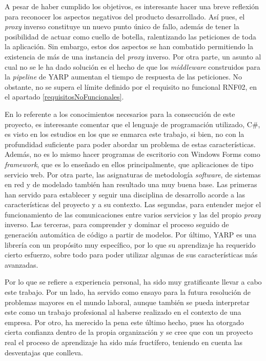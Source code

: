 \documentclass[11pt,spanish,listoffigures]{tfgetsinf}
\begin{document}
A pesar de haber cumplido los objetivos, es interesante hacer una breve reflexión para reconocer los aspectos negativos del producto desarrollado. Así pues, el \emph{proxy} inverso constituye un nuevo punto único de fallo, además de tener la posibilidad de actuar como cuello de botella, ralentizando las peticiones de toda la aplicación. Sin embargo, estos dos aspectos se han combatido permitiendo la existencia de más de una instancia del \emph{proxy} inverso. Por otra parte, un asunto al cual no se le ha dado solución es el hecho de que los \emph{middleware} construidos para la \emph{pipeline} de YARP aumentan el tiempo de respuesta de las peticiones. No obstante, no se supera el límite definido por el requisito no funcional RNF02, en el apartado \ref{requisitosNoFuncionales}.

En lo referente a los conocimientos necesarios para la consecución de este proyecto, es interesante comentar que el lenguaje de programación utilizado, C\#, es visto en los estudios en los que se enmarca este trabajo, si bien, no con la profundidad suficiente para poder abordar un problema de estas características. Además, no es lo mismo hacer programas de escritorio con Windows Forms \cite{WinForms} como \emph{framework}, que es lo enseñado en ellos principalmente, que aplicaciones de tipo servicio web. Por otra parte, las asignaturas de metodología \emph{software}, de sistemas en red y de modelado también han resultado una muy buena base. Las primeras han servido para establecer y seguir una disciplina de desarrollo acorde a las características del proyecto y a su contexto. Las segundas, para entender mejor el funcionamiento de las comunicaciones entre varios servicios y las del propio \emph{proxy} inverso. Las terceras, para comprender y dominar el proceso seguido de generación automática de código a partir de modelos. Por último, YARP es una librería con un propósito muy específico, por lo que su aprendizaje ha requerido cierto esfuerzo, sobre todo para poder utilizar algunas de sus características más avanzadas.

Por lo que se refiere a experiencia personal, ha sido muy gratificante llevar a cabo este trabajo. Por un lado, ha servido como ensayo para la futura resolución de problemas mayores en el mundo laboral, aunque también se pueda interpretar este como un trabajo profesional al haberse realizado en el contexto de una empresa. Por otro, ha merecido la pena este último hecho, pues ha otorgado cierta confianza dentro de la propia organización y se cree que con un proyecto real el proceso de aprendizaje ha sido más fructífero, teniendo en cuenta las desventajas que conlleva.
\end{document}
